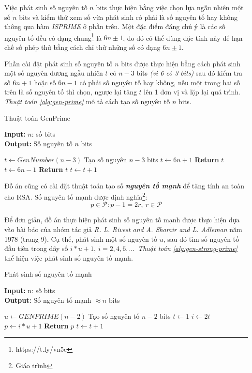 Việc phát sinh số nguyên tố $n$ bits thực hiện bằng việc chọn lựa ngẫu nhiên một số $n$ bits và kiểm thử xem số vừa phát sinh có phải là số nguyên tố hay không 
thông qua hàm \textit{ISPRIME} ở phần trên. Một đặc điểm đáng chú ý là các số nguyên tố đều có dạng chung\footnote{https://t.ly/vn5e} là  $6n \pm 1$, do đó có thể dùng đặc tính này để hạn chế số phép 
thử bằng cách chỉ thử những số có dạng $6n \pm 1$.

Phần cài đặt phát sinh số nguyên tố $n$ bits được thực hiện bằng cách phát sinh một số nguyên dương ngẫu nhiên $t$ có $n-3$ bits \textit{(vì 6 có 3 bits)} sau đó kiểm tra số 
$6n + 1$ hoặc số $6n - 1$ có phải số nguyên tố hay không, nếu một trong hai số trên là số nguyên tố thì chọn, ngược lại tăng $t$ lên 1 đơn vị và lặp lại quá trình. 
\textit{Thuật toán \ref{alg:gen-prime}} mô tả cách tạo số nguyên tố $n$ bits.

\begin{algorithm}
\caption{Thuật toán GenPrime}\label{alg:gen-prime}
\hspace*{\algorithmicindent} \textbf{Input:} $n$: số bits\\
\hspace*{\algorithmicindent} \textbf{Output:} Số nguyên tố $n$ bits 
\begin{algorithmic}[1]
\State $t \gets GenNumber(n-3)$ \Comment Tạo số nguyên $n-3$ bits
\State $t \gets 6n + 1$
\State \textbf{Return } $t$
\EndIf
\State $t \gets 6n - 1$
\State \textbf{Return } $t$
\EndIf
\State $t \gets t + 1$
\EndWhile
\EndProcedure
\end{algorithmic}
\end{algorithm}

Đồ án cũng có cài đặt thuật toán tạo số \textbf{\textit{nguyên tố mạnh}} để tăng tính an toàn cho RSA. Số nguyên tố mạnh được định nghĩa\footnote{Giáo trình}:
\[ p \in \mathcal{P}: p - 1 = 2r,\ r \in \mathcal{P} \]

Để đơn giản, đồ án thực hiện phát sinh số nguyên tố mạnh được thực hiện dựa vào bài báo \cite{Rivest1978} của nhóm tác giả \textit{R. L. Rivest and 
A. Shamir and L. Adleman} năm 1978 (trang 9). Cụ thể, phát sinh một số nguyên tố $u$, sau đó tìm số nguyên tố đầu tiên trong dãy số $i*u + 1,\ i=2,4,6,...$\ \textit{Thuật toán \ref{alg:gen-strong-prime}} 
thể hiện việc phát sinh số nguyên tố mạnh.

\begin{algorithm}
\caption{Phát sinh số nguyên tố mạnh}\label{alg:gen-strong-prime}
\hspace*{\algorithmicindent} \textbf{Input:} n: số bits\\
\hspace*{\algorithmicindent} \textbf{Output:} Số nguyên tố mạnh $\approx n$ bits 
\begin{algorithmic}[1]
\State $u \gets GENPRIME(n-2)$ \Comment Tạo số nguyên tố $n-2$ bits
\State $t \gets 1$
\State $i \gets 2t$
\State $p \gets i*u + 1$
\State \textbf{Return } $p$
\EndIf
\State $t \gets t + 1$
\EndWhile
\EndProcedure
\end{algorithmic}
\end{algorithm}

